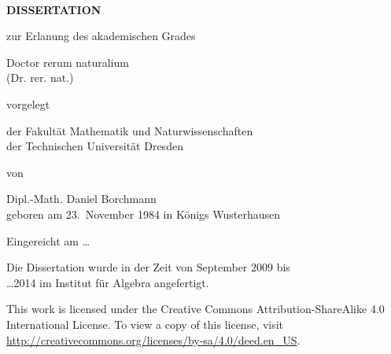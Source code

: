 
~\cleardoublepage

\begin{center}
  \vfill{}

  \Huge\makeatletter\textsf{\textbf{\@title}}\makeatother

  \vfill{}

  \LARGE
  \textbf{D\;I\;S\;S\;E\;R\;T\;A\;T\;I\;O\;N}

  \vspace*{2ex}
  zur Erlanung des akademischen Grades
  \vspace*{2ex}

  Doctor rerum naturalium \\
  (Dr. rer. nat.)

  \vfill

  vorgelegt

  \vfill

  der Fakultät Mathematik und Naturwissenschaften\\
  der Technischen Universität Dresden

  \vfill

  von

  \vfill

  {\large
    Dipl.-Math. Daniel Borchmann\\
    \vspace*{.7ex}
    geboren am 23.\ November 1984 in Königs Wusterhausen
  }

  \vfill

  Eingereicht am \dots

  \vfill

  \large

  Die Dissertation wurde in der Zeit von September 2009 bis\\
  \dots 2014 im Institut für Algebra angefertigt.
\end{center}

\newpage

\vspace*{\fill}

\noindent%
This work is licensed under the Creative Commons Attribution-ShareAlike 4.0 International
License. To view a copy of this license, visit
\url{http://creativecommons.org/licenses/by-sa/4.0/deed.en_US}.

